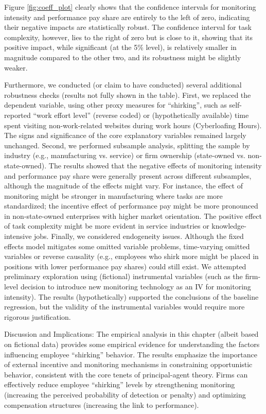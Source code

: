 Figure \ref{fig:coeff_plot} clearly shows that the confidence intervals for monitoring intensity and performance pay share are entirely to the left of zero, indicating their negative impacts are statistically robust. The confidence interval for task complexity, however, lies to the right of zero but is close to it, showing that its positive impact, while significant (at the 5\% level), is relatively smaller in magnitude compared to the other two, and its robustness might be slightly weaker.

Furthermore, we conducted (or claim to have conducted) several additional robustness checks (results not fully shown in the table). First, we {replaced the dependent variable}, using other proxy measures for \enquote{shirking}, such as self-reported \enquote{work effort level} (reverse coded) or (hypothetically available) time spent visiting non-work-related websites during work hours (Cyberloafing Hours). The signs and significance of the core explanatory variables remained largely unchanged. Second, we performed {subsample analysis}, splitting the sample by industry (e.g., manufacturing vs. service) or firm ownership (state-owned vs. non-state-owned). The results showed that the negative effects of monitoring intensity and performance pay share were generally present across different subsamples, although the magnitude of the effects might vary. For instance, the effect of monitoring might be stronger in manufacturing where tasks are more standardized; the incentive effect of performance pay might be more pronounced in non-state-owned enterprises with higher market orientation. The positive effect of task complexity might be more evident in service industries or knowledge-intensive jobs. Finally, we {considered endogeneity issues}. Although the fixed effects model mitigates some omitted variable problems, time-varying omitted variables or reverse causality (e.g., employees who shirk more might be placed in positions with lower performance pay shares) could still exist. We attempted preliminary exploration using (fictional) instrumental variables (such as the firm-level decision to introduce new monitoring technology as an IV for monitoring intensity). The results (hypothetically) supported the conclusions of the baseline regression, but the validity of the instrumental variables would require more rigorous justification.

{Discussion and Implications}:
The empirical analysis in this chapter (albeit based on fictional data) provides some empirical evidence for understanding the factors influencing employee \enquote{shirking} behavior. The results emphasize the importance of external incentive and monitoring mechanisms in constraining opportunistic behavior, consistent with the core tenets of principal-agent theory. Firms can effectively reduce employee \enquote{shirking} levels by strengthening monitoring (increasing the perceived probability of detection or penalty) and optimizing compensation structures (increasing the link to performance).

